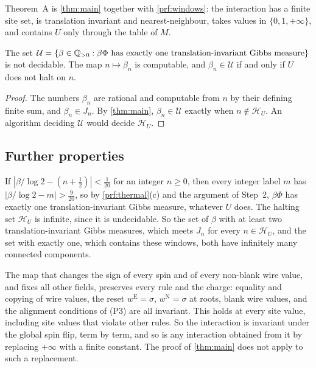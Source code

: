 Theorem~A is \cref{thm:main} together with \cref{prf:windows}: the interaction has a finite site set, is translation invariant and nearest-neighbour, takes values in $\{0,1,+\infty\}$, and contains $U$ only through the table of $M$.

\begin{corollary}\label{cor:undecidable}
The set $\mathcal U=\{\beta\in\mathbb{Q}_{>0}:\beta\Phi\text{ has exactly one translation-invariant Gibbs measure}\}$ is not decidable. The map $n\mapsto\beta_n$ is computable, and $\beta_n\in\mathcal U$ if and only if $U$ does not halt on $n$.
\end{corollary}

\begin{proof}
The numbers $\beta_n$ are rational and computable from $n$ by their defining finite sum, and $\beta_n\in J_n$. By \cref{thm:main}, $\beta_n\in\mathcal U$ exactly when $n\notin\mathcal H_U$. An algorithm deciding $\mathcal U$ would decide $\mathcal H_U$.
\end{proof}

\subsection{Further properties}

\begin{remark}\label{prf:rem-midpoint}
If $|\beta/\log2-(n+\frac12)|<\frac1{20}$ for an integer $n\ge0$, then every integer label $m$ has $|\beta/\log2-m|>\frac9{20}$, so by \cref{prf:thermal}(c) and the argument of Step~2, $\beta\Phi$ has exactly one translation-invariant Gibbs measure, whatever $U$ does. The halting set $\mathcal H_U$ is infinite, since it is undecidable. So the set of $\beta$ with at least two translation-invariant Gibbs measures, which meets $J_n$ for every $n\in\mathcal H_U$, and the set with exactly one, which contains these windows, both have infinitely many connected components.
\end{remark}

\begin{remark}\label{prf:rem-flip}
The map that changes the sign of every spin and of every non-blank wire value, and fixes all other fields, preserves every rule and the charge: equality and copying of wire values, the reset $w^{\mathrm E}=\sigma$, $w^{\mathrm N}=\sigma$ at roots, blank wire values, and the alignment conditions of (P3) are all invariant. This holds at every site value, including site values that violate other rules. So the interaction is invariant under the global spin flip, term by term, and so is any interaction obtained from it by replacing $+\infty$ with a finite constant. The proof of \cref{thm:main} does not apply to such a replacement.
\end{remark}
